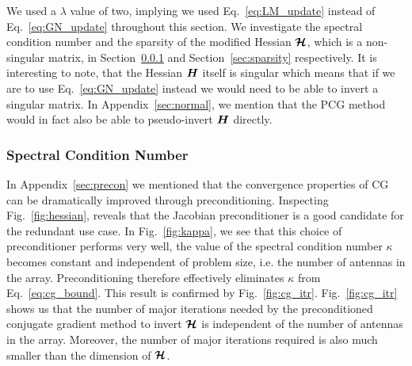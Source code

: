 \documentclass[useAMS,usenatbib]{mn2e}
\newcommand{\bH}{\bmath{H}}
\newcommand{\bmH}{\bmath{\mathcal{H}}}
\begin{document}
We used a $\lambda$ value of two, implying we used Eq.~\eqref{eq:LM_update} instead of Eq.~\eqref{eq:GN_update} throughout this section.
We investigate the spectral condition number and the sparsity of the modified Hessian $\bmH$, which is a non-singular matrix, in Section~\ref{sec:scn} and Section~\ref{sec:sparsity} respectively.
It is interesting to note, that the Hessian $\bH$ itself is singular which means that if we are to use Eq.~\eqref{eq:GN_update} instead we would need to be able to invert a singular matrix. In Appendix~\ref{sec:normal},
we mention that the PCG method would in fact also be able to pseudo-invert $\bH$ directly.

\subsubsection{Spectral Condition Number}
\label{sec:scn}
In Appendix~\ref{sec:precon} we mentioned that the convergence properties of CG can be dramatically improved through preconditioning. Inspecting Fig.~\ref{fig:hessian}, reveals that the Jacobian preconditioner
is a good candidate for the redundant use case. In Fig.~\ref{fig:kappa}, we see that this choice of preconditioner performs very well, the value of the spectral condition number $\kappa$
becomes constant and independent of problem size, i.e. the number of antennas in the array. Preconditioning therefore effectively eliminates $\kappa$ from Eq.~\eqref{eq:cg_bound}. This result
is confirmed by Fig.~\ref{fig:cg_itr}. Fig.~\ref{fig:cg_itr} shows us that the number of major iterations needed by the preconditioned conjugate gradient method to invert $\bmH$ is independent of the number of antennas in the array.
Moreover, the number of major iterations required is also much smaller than the dimension of $\bmH$. 
\end{document}
